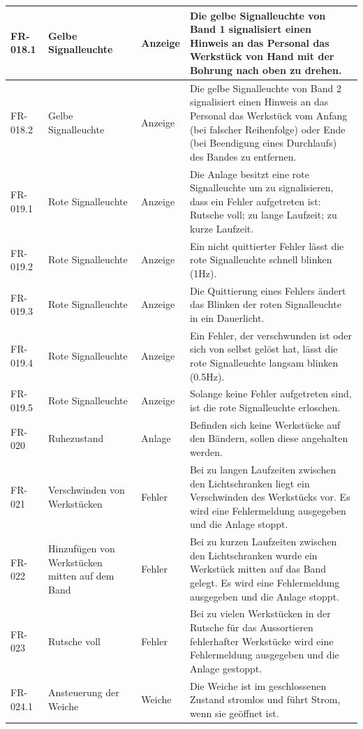 \documentclass[oneside,a4paper,titlepage]{scrartcl} %
\begin{document}
\begin{small}
\begin{longtable}{|C{2cm}|L{4cm}|C{1.5cm}|L{5.5cm}|}
  \hline
   FR-018.1 & Gelbe Signalleuchte & Anzeige & Die gelbe Signalleuchte von Band 1 signalisiert einen Hinweis an das Personal das Werkstück von Hand mit der Bohrung nach oben zu drehen.\\
  \hline
   FR-018.2 & Gelbe Signalleuchte & Anzeige & Die gelbe Signalleuchte von Band 2 signalisiert einen Hinweis an das Personal das Werkstück vom Anfang (bei falscher Reihenfolge) oder  Ende (bei Beendigung eines Durchlaufs) des Bandes zu entfernen.\\
  \hline
  FR-019.1 & Rote Signalleuchte & Anzeige & Die Anlage besitzt eine rote Signalleuchte um zu signalisieren, dass ein Fehler aufgetreten ist: Rutsche voll; zu lange Laufzeit; zu kurze Laufzeit.\\
  \hline
  FR-019.2 & Rote Signalleuchte & Anzeige & Ein nicht quittierter Fehler lässt die rote Signalleuchte schnell blinken (1Hz).\\
  \hline
  FR-019.3 & Rote Signalleuchte & Anzeige & Die Quittierung eines Fehlers ändert das Blinken der roten Signalleuchte in ein Dauerlicht.\\
  \hline
  FR-019.4 & Rote Signalleuchte & Anzeige & Ein Fehler, der verschwunden ist oder sich von selbst gelöst hat, lässt die rote Signalleuchte langsam blinken (0.5Hz).\\
  \hline
  FR-019.5 & Rote Signalleuchte & Anzeige & Solange keine Fehler aufgetreten sind, ist die rote Signalleuchte erloschen.\\
  \hline
   FR-020 & Ruhezustand & Anlage & Befinden sich keine Werkstücke auf den Bändern, sollen diese angehalten werden.\\
  \hline
  FR-021 & Verschwinden von Werkstücken & Fehler & Bei zu langen Laufzeiten zwischen den Lichtschranken liegt ein Verschwinden des Werkstücks vor. Es wird eine Fehlermeldung ausgegeben und die Anlage stoppt.\\
  \hline
   FR-022 & Hinzufügen von Werkstücken mitten auf dem Band & Fehler & Bei zu kurzen Laufzeiten zwischen den Lichtschranken wurde ein Werkstück mitten auf das Band gelegt. Es wird eine Fehlermeldung ausgegeben und die Anlage stoppt.\\
  \hline
  FR-023 & Rutsche voll & Fehler & Bei zu vielen Werkstücken in der Rutsche für das Aussortieren fehlerhafter Werkstücke wird eine Fehlermeldung ausgegeben und die Anlage gestoppt.\\
  \hline
   FR-024.1 & Ansteuerung der Weiche & Weiche & Die Weiche ist im geschlossenen Zustand stromlos und führt Strom, wenn sie geöffnet ist.\\

\end{longtable}
\end{small}
\end{document}
